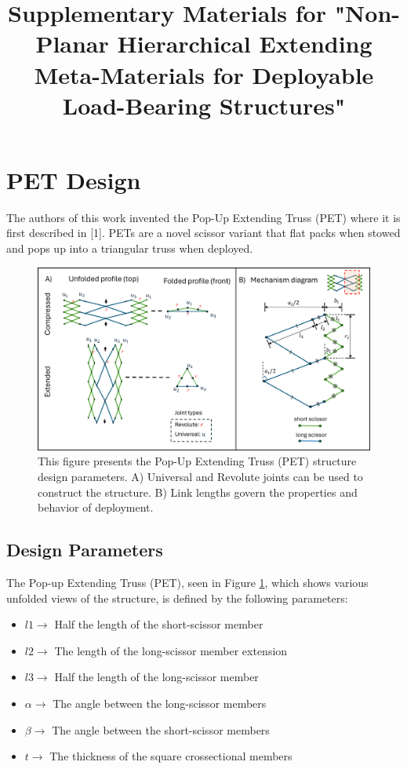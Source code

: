 \documentclass[11pt, a4paper]{article}
\title{Supplementary Materials for "Non-Planar Hierarchical Extending Meta-Materials for Deployable Load-Bearing Structures"}
\date{}
\begin{document}
\maketitle

\section{PET Design}
The authors of this work invented the Pop-Up Extending Truss (PET) where it is first described in [1]. PETs are a novel scissor variant that flat packs when stowed and pops up into a triangular truss when deployed. 
\begin{figure}[ht]
\centering
\includegraphics[width=\linewidth]{figures-sup/PET relations.png}

\centering
\caption{This figure presents the Pop-Up Extending Truss (PET) structure design parameters. A) Universal and Revolute joints can be used to construct the structure. B) Link lengths govern the properties and behavior of deployment.}
\label{fig:PET_parameters}
\end{figure}

\subsection{Design Parameters}
The Pop-up Extending Truss (PET), seen in Figure \ref{fig:PET_parameters}, which shows various unfolded views of the structure, is defined by the following parameters:
\begin{itemize}
    \item $l1 \rightarrow$ Half the length of the short-scissor member
    \item $l2 \rightarrow$ The length of the long-scissor member extension
    \item $l3 \rightarrow$ Half the length of the long-scissor member
    \item $\alpha \rightarrow$ The angle between the long-scissor members
    \item $\beta \rightarrow$ The angle between the short-scissor members
    \item $t \rightarrow$ The thickness of the square crossectional members 
\end{itemize}
\end{document}
